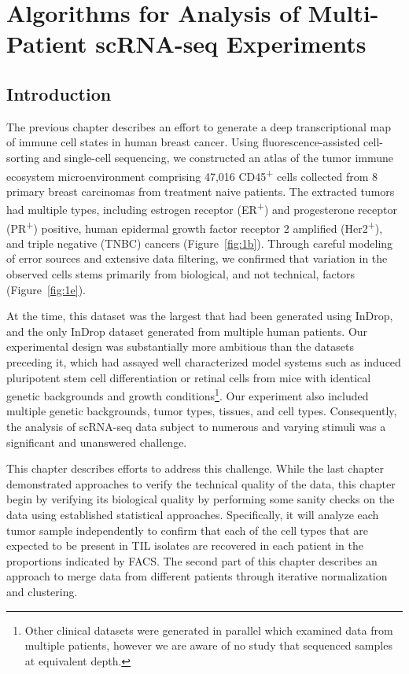 
\chapter[Algorithms for Analysis of Multi-Patient scRNA-seq Experiments][Algorithms for Analysis of Multi-Patient scRNA-seq Experiments]{Algorithms for Analysis of Multi-Patient scRNA-seq Experiments}

\section{Introduction}

The previous chapter describes an effort to generate a deep transcriptional map of immune cell states in human breast cancer.
Using fluorescence-assisted cell-sorting and single-cell sequencing, we constructed an atlas of the tumor immune ecosystem microenvironment comprising 47,016 CD45\textsuperscript{+} cells collected from 8 primary breast carcinomas from treatment naive patients. 
The extracted tumors had multiple types, including estrogen receptor (ER\textsuperscript{+}) and progesterone receptor (PR\textsuperscript{+}) positive, human epidermal growth factor receptor 2 amplified (Her2\textsuperscript{+}), and triple negative (TNBC) cancers (Figure~\ref{fig:1b}). 
Through careful modeling of error sources and extensive data filtering, we confirmed that variation in the observed cells stems primarily from biological, and not technical, factors (Figure~\ref{fig:1e}).

At the time, this dataset was the largest that had been generated using InDrop, and the only InDrop dataset generated from multiple human patients.
Our experimental design was substantially more ambitious than the datasets preceding it, which had assayed well characterized model systems such as induced pluripotent stem cell differentiation \citep{Klein2015} or retinal cells \citep{Macosko2015} from mice with identical genetic backgrounds and growth conditions\footnote{Other clinical datasets were generated in parallel which examined data from multiple patients\citep{Tirosh2016}, however we are aware of no study that sequenced samples at equivalent depth.}. 
Our experiment also included multiple genetic backgrounds, tumor types, tissues, and cell types. 
Consequently, the analysis of scRNA-seq data subject to numerous and varying stimuli was a significant and unanswered challenge.  

This chapter describes efforts to address this challenge.
While the last chapter demonstrated approaches to verify the technical quality of the data, this chapter begin by verifying its biological quality by performing some sanity checks on the data using established statistical approaches. 
Specifically, it will analyze each tumor sample independently to confirm that each of the cell types that are expected to be present in TIL isolates are recovered in each patient in the proportions indicated by FACS\@.
The second part of this chapter describes an approach to merge data from different patients through iterative normalization and clustering. 
 
